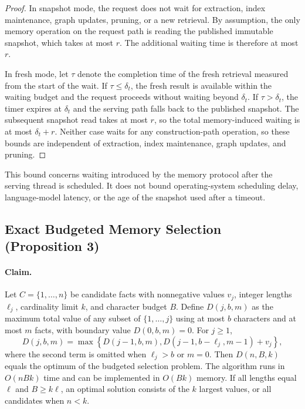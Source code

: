 \documentclass[letterpaper]{article} %
\begin{document}
\begin{proof}
In snapshot mode, the request does not wait for extraction, index maintenance, graph updates, pruning, or a new retrieval. By assumption, the only memory operation on the request path is reading the published immutable snapshot, which takes at most $r$. The additional waiting time is therefore at most $r$.

In fresh mode, let $\tau$ denote the completion time of the fresh retrieval measured from the start of the wait. If $\tau\le\delta_t$, the fresh result is available within the waiting budget and the request proceeds without waiting beyond $\delta_t$. If $\tau>\delta_t$, the timer expires at $\delta_t$ and the serving path falls back to the published snapshot. The subsequent snapshot read takes at most $r$, so the total memory-induced waiting is at most $\delta_t+r$. Neither case waits for any construction-path operation, so these bounds are independent of extraction, index maintenance, graph updates, and pruning.
\end{proof}

This bound concerns waiting introduced by the memory protocol after the serving thread is scheduled. It does not bound operating-system scheduling delay, language-model latency, or the age of the snapshot used after a timeout.

\subsection{Exact Budgeted Memory Selection (Proposition 3)}

\paragraph{Claim.} Let $C=\{1,\ldots,n\}$ be candidate facts with nonnegative values $v_j$, integer lengths $\ell_j$, cardinality limit $k$, and character budget $B$. Define $D(j,b,m)$ as the maximum total value of any subset of $\{1,\ldots,j\}$ using at most $b$ characters and at most $m$ facts, with boundary value $D(0,b,m)=0$. For $j\ge1$,
\begin{equation}
D(j,b,m)=\max\left\{D(j-1,b,m),D(j-1,b-\ell_j,m-1)+v_j\right\},
\end{equation}
where the second term is omitted when $\ell_j>b$ or $m=0$. Then $D(n,B,k)$ equals the optimum of the budgeted selection problem. The algorithm runs in $O(nBk)$ time and can be implemented in $O(Bk)$ memory. If all lengths equal $\ell$ and $B\ge k\ell$, an optimal solution consists of the $k$ largest values, or all candidates when $n<k$.
\end{document}
